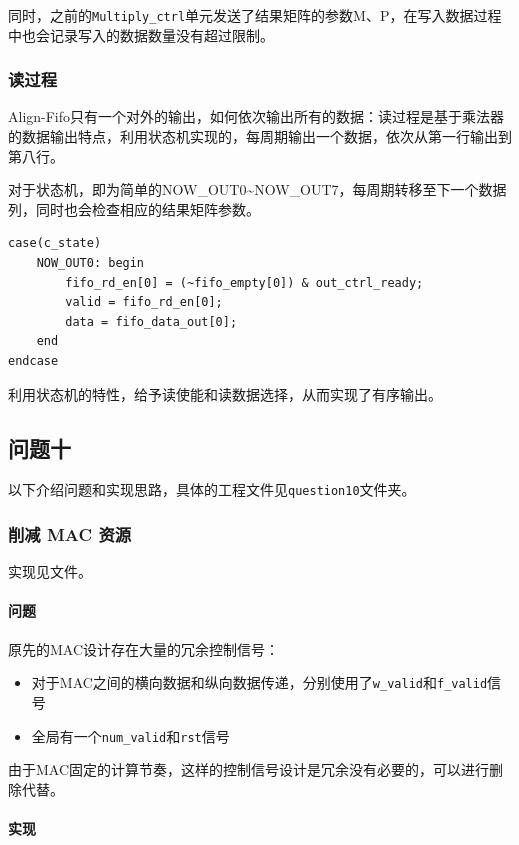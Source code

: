 \documentclass[12pt,a4paper]{article}
\begin{document}
同时，之前的\texttt{Multiply\_ctrl}单元发送了结果矩阵的参数M、P，在写入数据过程中也会记录写入的数据数量没有超过限制。

\subsubsection{读过程}

Align-Fifo只有一个对外的输出，如何依次输出所有的数据：读过程是基于乘法器的数据输出特点，利用状态机实现的，每周期输出一个数据，依次从第一行输出到第八行。

对于状态机，即为简单的NOW\_OUT0\textasciitilde NOW\_OUT7，每周期转移至下一个数据列，同时也会检查相应的结果矩阵参数。

\begin{lstlisting}
case(c_state)
    NOW_OUT0: begin
        fifo_rd_en[0] = (~fifo_empty[0]) & out_ctrl_ready;
        valid = fifo_rd_en[0];
        data = fifo_data_out[0];
    end
endcase
\end{lstlisting}

利用状态机的特性，给予读使能和读数据选择，从而实现了有序输出。

\subsection{问题十}

以下介绍问题和实现思路，具体的工程文件见\texttt{question10}文件夹。

\subsubsection{削减 MAC 资源}

实现见文件。

\paragraph{问题}

原先的MAC设计存在大量的冗余控制信号：

\begin{itemize}
\item
  对于MAC之间的横向数据和纵向数据传递，分别使用了\texttt{w\_valid}和\texttt{f\_valid}信号
\item
  全局有一个\texttt{num\_valid}和\texttt{rst}信号
\end{itemize}

由于MAC固定的计算节奏，这样的控制信号设计是冗余没有必要的，可以进行删除代替。

\paragraph{实现}
\end{document}
